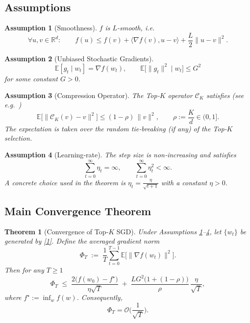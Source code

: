 \documentclass[11pt]{article}
\newtheorem{theorem}{Theorem}
\newtheorem{assumption}{Assumption}
\newcommand{\E}{\mathbb{E}}
\newcommand{\R}{\mathbb{R}}
\begin{document}
\subsection*{Assumptions}
\begin{assumption}[Smoothness]\label{ass:smooth}
\(f\) is \(L\)-smooth, i.e.
\[
\forall u,v\in\R^{d}:\qquad
f(u)\le f(v)+\langle\nabla f(v),u-v\rangle+\frac{L}{2}\|u-v\|^{2}.
\tag{A1}
\]
\end{assumption}

\begin{assumption}[Unbiased Stochastic Gradients]\label{ass:unbiased}
\[
\E[g_t\mid w_t]=\nabla f(w_t),\qquad
\E\big[\|g_t\|^{2}\mid w_t\big]\le G^{2}
\tag{A2}
\]
for some constant \(G>0\).
\end{assumption}

\begin{assumption}[Compression Operator]\label{ass:compression}
The Top‑\(K\) operator \(\mathcal{C}_K\) satisfies (see e.g.~\cite{Alistarh2017})
\[
\E\!\big[\|\mathcal{C}_K(v)-v\|^{2}\big]\le (1-\rho)\,\|v\|^{2},
\qquad
\rho:=\frac{K}{d}\in(0,1].
\tag{A3}
\]
The expectation is taken over the random tie‑breaking (if any) of the
Top‑\(K\) selection.
\end{assumption}

\begin{assumption}[Learning‑rate]\label{ass:lr}
The step size is non‑increasing and satisfies
\[
\sum_{t=0}^{\infty}\eta_t =\infty, \qquad
\sum_{t=0}^{\infty}\eta_t^{2}<\infty .
\tag{A4}
\]
A concrete choice used in the theorem is \(\eta_t=\frac{\eta}{\sqrt{t+1}}\)
with a constant \(\eta>0\).
\end{assumption}

\subsection*{Main Convergence Theorem}
\begin{theorem}[Convergence of Top‑\(K\) SGD]\label{thm:main}
Under Assumptions \ref{ass:smooth}–\ref{ass:lr}, let \(\{w_t\}\) be generated by
\eqref{1}.  Define the averaged gradient norm
\[
\Phi_T \;:=\; \frac{1}{T}\sum_{t=0}^{T-1}
\E\!\big[\|\nabla f(w_t)\|^{2}\big].
\]
Then for any \(T\ge1\)
\[
\Phi_T \;\le\;
\frac{2\big(f(w_0)-f^\star\big)}{\eta\sqrt{T}}
\;+\;
\frac{L G^{2}\big(1+(1-\rho)\big)}{\rho}\,
\frac{\eta}{\sqrt{T}},
\tag{2}
\]
where \(f^\star:=\inf_{w}f(w)\).  Consequently,
\[
\Phi_T = \mathcal{O}\!\Big(\frac{1}{\sqrt{T}}\Big).
\]
\end{theorem}
\end{document}
